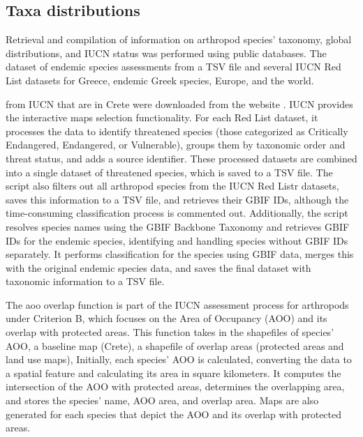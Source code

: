     \subsection{Taxa distributions}
    \label{subsec:arthropods-eoo-aoo}
Retrieval and compilation of information on arthropod species' taxonomy,
global distributions, and IUCN status was performed using public databases.
The dataset of endemic species assessments from a TSV file and several IUCN Red
List datasets for Greece, endemic Greek species, Europe, and the world.

from IUCN that are in Crete were downloaded from the website \parencite{iucn2024}. IUCN provides the 
interactive maps selection functionality. 
For each Red List dataset, it processes the data to identify threatened species
(those categorized as Critically Endangered, Endangered, or Vulnerable), groups
them by taxonomic order and threat status, and adds a source identifier.
These processed datasets are combined into a single dataset of threatened species, which is saved to a TSV file.
The script also filters out all arthropod species from the IUCN Red Listr
datasets, saves this information to a TSV file, and retrieves their GBIF IDs,
although the time-consuming classification process is commented out.
Additionally, the script resolves species names using the GBIF Backbone Taxonomy
and retrieves GBIF IDs for the endemic species, identifying and handling species
without GBIF IDs separately. It performs classification for the species using
GBIF data, merges this with the original endemic species data, and saves the
final dataset with taxonomic information to a TSV file.

The aoo overlap function is part of the IUCN assessment process for arthropods
under Criterion B, which focuses on the Area of Occupancy (AOO) and its overlap
with protected areas. This function takes in the shapefiles of species' AOO,
a baseline map (Crete), a shapefile of overlap areas (protected areas and land use maps),
Initially, each species' AOO is calculated, converting the data to a spatial feature
and calculating its area in square kilometers. It computes the intersection of
the AOO with protected areas, determines the overlapping area, and stores the
species' name, AOO area, and overlap area. Maps are also generated for each
species that depict the AOO and its overlap with protected areas.

